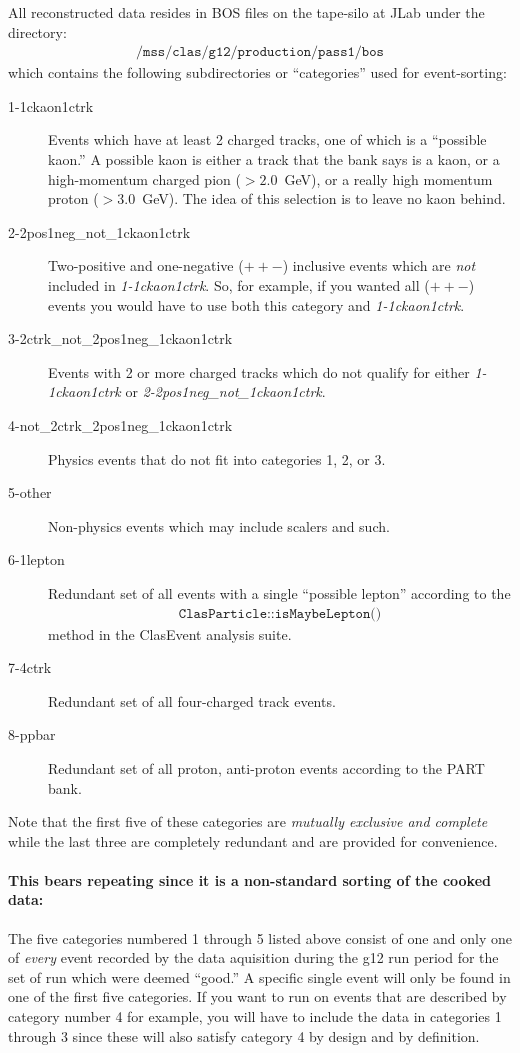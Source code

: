 All reconstructed data resides in BOS files on the tape-silo at JLab under the directory:
\begin{align}
\texttt{/mss/clas/g12/production/pass1/bos} \nonumber
\end{align}
which contains the following subdirectories or ``categories'' used for event-sorting:
\begin{description}
    \item[1-1ckaon1ctrk] Events which have at least 2 charged tracks, one of which is a ``possible kaon.'' A possible kaon is either a track that the  bank says is a kaon, or a high-momentum charged pion ($> 2.0$~GeV), or a really high momentum proton ($> 3.0$~GeV). The idea of this selection is to leave no kaon behind.
    \item[2-2pos1neg\_not\_1ckaon1ctrk] Two-positive and one-negative ($++-$) inclusive events which are \emph{not} included in \emph{1-1ckaon1ctrk}. So, for example, if you wanted all ($++-$) events you would have to use both this category and \emph{1-1ckaon1ctrk}.
    \item[3-2ctrk\_not\_2pos1neg\_1ckaon1ctrk] Events with 2 or more charged tracks which do not qualify for either \emph{1-1ckaon1ctrk} or \emph{2-2pos1neg\_not\_1ckaon1ctrk}.
    \item[4-not\_2ctrk\_2pos1neg\_1ckaon1ctrk] Physics events that do not fit into categories 1, 2, or 3.
    \item[5-other] Non-physics events which may include scalers and such.
    \item[6-1lepton] Redundant set of all events with a single ``possible lepton'' according to the
    \begin{align}
        \texttt{ClasParticle::isMaybeLepton()} \nonumber
    \end{align}
    method in the ClasEvent analysis suite.
    \item[7-4ctrk] Redundant set of all four-charged track events.
    \item[8-ppbar] Redundant set of all proton, anti-proton events according to the PART bank.
\end{description}
Note that the first five of these categories are \emph{mutually exclusive and complete} while the last three are completely redundant and are provided for convenience.

\paragraph{This bears repeating since it is a non-standard sorting of the cooked data:} The five categories numbered 1 through 5 listed above consist of one and only one of \emph{every} event recorded by the data aquisition during the g12 run period for the set of run which were deemed ``good.'' A specific single event will only be found in one of the first five categories. If you want to run on events that are described by category number 4 for example, you will have to include the data in categories 1 through 3 since these will also satisfy category 4 by design and by definition.


